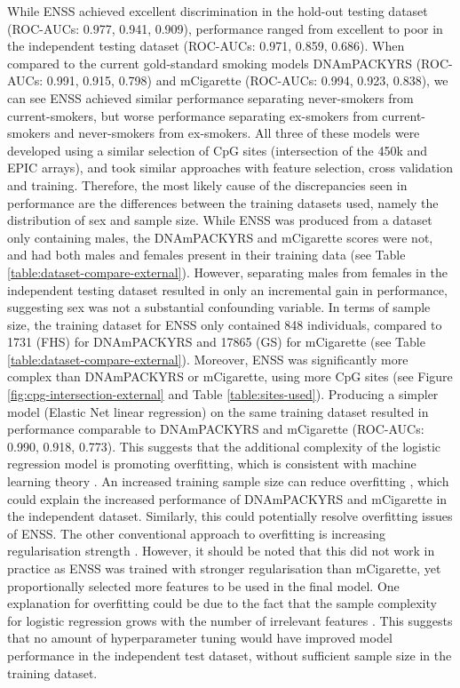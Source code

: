 \documentclass{article} %
\begin{document}
While ENSS achieved excellent discrimination in the hold-out testing dataset (ROC-AUCs: 0.977, 0.941, 0.909), performance ranged from excellent to poor in the independent testing dataset (ROC-AUCs: 0.971, 0.859, 0.686). When compared to the current gold-standard smoking models DNAmPACKYRS (ROC-AUCs: 0.991, 0.915, 0.798) and mCigarette (ROC-AUCs: 0.994, 0.923, 0.838), we can see ENSS achieved similar performance separating never-smokers from current-smokers, but worse performance separating ex-smokers from current-smokers and never-smokers from ex-smokers. All three of these models were developed using a similar selection of CpG sites (intersection of the 450k and EPIC arrays), and took similar approaches with feature selection, cross validation and training. Therefore, the most likely cause of the discrepancies seen in performance are the differences between the training datasets used, namely the distribution of sex and sample size. While ENSS was produced from a dataset only containing males, the DNAmPACKYRS and mCigarette scores were not, and had both males and females present in their training data (see Table \ref{table:dataset-compare-external}). However, separating males from females in the independent testing dataset resulted in only an incremental gain in performance, suggesting sex was not a substantial confounding variable. In terms of sample size, the training dataset for ENSS only contained 848 individuals, compared to \num{1731} (FHS) for DNAmPACKYRS and \num{17865} (GS) for mCigarette (see Table \ref{table:dataset-compare-external}). Moreover, ENSS was significantly more complex than DNAmPACKYRS or mCigarette, using more CpG sites (see Figure \ref{fig:cpg-intersection-external} and Table \ref{table:sites-used}). Producing a simpler model (Elastic Net linear regression) on the same training dataset resulted in performance comparable to DNAmPACKYRS and mCigarette (ROC-AUCs: 0.990, 0.918, 0.773). This suggests that the additional complexity of the logistic regression model is promoting overfitting, which is consistent with machine learning theory \cite{bishop2006pattern}. An increased training sample size can reduce overfitting \cite{bishop2006pattern}, which could explain the increased performance of DNAmPACKYRS and mCigarette in the independent dataset. Similarly, this could potentially resolve overfitting issues of ENSS. The other conventional approach to overfitting is increasing regularisation strength \cite{buhlmann2011statistics}. However, it should be noted that this did not work in practice as ENSS was trained with stronger regularisation than mCigarette, yet proportionally selected more features to be used in the final model. One explanation for overfitting could be due to the fact that the sample complexity for logistic regression grows with the number of irrelevant features \cite{ng2004feature}. This suggests that no amount of hyperparameter tuning would have improved model performance in the independent test dataset, without sufficient sample size in the training dataset.
\end{document}
